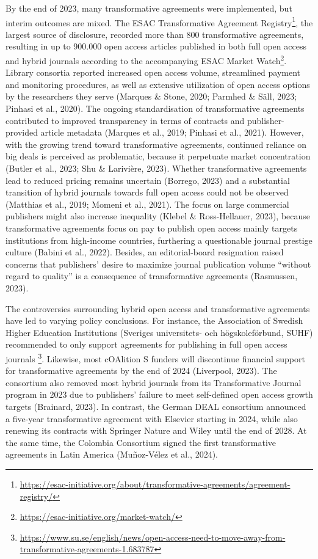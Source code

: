 \documentclass[a4paper,man,floatsintext,longtable,noextraspace,12pt]{apa6}
\begin{document}
By the end of 2023, many transformative agreements were implemented, but
interim outcomes are mixed. The ESAC Transformative Agreement
Registry\footnote{\url{https://esac-initiative.org/about/transformative-agreements/agreement-registry/}},
the largest source of disclosure, recorded more than 800 transformative
agreements, resulting in up to 900.000 open access articles published in
both full open access and hybrid journals according to the accompanying
ESAC Market Watch\footnote{\url{https://esac-initiative.org/market-watch/}}.
Library consortia reported increased open access volume, streamlined
payment and monitoring procedures, as well as extensive utilization of
open access options by the researchers they serve (Marques \& Stone,
2020; Parmhed \& Säll, 2023; Pinhasi et al., 2020). The ongoing
standardisation of transformative agreements contributed to improved
transparency in terms of contracts and publisher-provided article
metadata (Marques et al., 2019; Pinhasi et al., 2021). However, with the
growing trend toward transformative agreements, continued reliance on
big deals is perceived as problematic, because it perpetuate market
concentration (Butler et al., 2023; Shu \& Larivière, 2023). Whether
transformative agreements lead to reduced pricing remains uncertain
(Borrego, 2023) and a substantial transition of hybrid journals towards
full open access could not be observed (Matthias et al., 2019; Momeni et
al., 2021). The focus on large commercial publishers might also increase
inequality (Klebel \& Ross-Hellauer, 2023), because transformative
agreements focus on pay to publish open access mainly targets
institutions from high-income countries, furthering a questionable
journal prestige culture (Babini et al., 2022). Besides, an
editorial-board resignation raised concerns that publishers' desire to
maximize journal publication volume ``without regard to quality'' is a
consequence of transformative agreements (Rasmussen, 2023).

The controversies surrounding hybrid open access and transformative
agreements have led to varying policy conclusions. For instance, the
Association of Swedish Higher Education Institutions (Sveriges
universitets- och högskoleförbund, SUHF) recommended to only support
agreements for publishing in full open access journals \footnote{\url{https://www.su.se/english/news/open-access-need-to-move-away-from-transformative-agreements-1.683787}}.
Likewise, most cOAlition S funders will discontinue financial support
for transformative agreements by the end of 2024 (Liverpool, 2023). The
consortium also removed most hybrid journals from its Transformative
Journal program in 2023 due to publishers' failure to meet self-defined
open access growth targets (Brainard, 2023). In contrast, the German
DEAL consortium announced a five-year transformative agreement with
Elsevier starting in 2024, while also renewing its contracts with
Springer Nature and Wiley until the end of 2028. At the same time, the
Colombia Consortium signed the first transformative agreements in Latin
America (Muñoz-Vélez et al., 2024).
\end{document}
